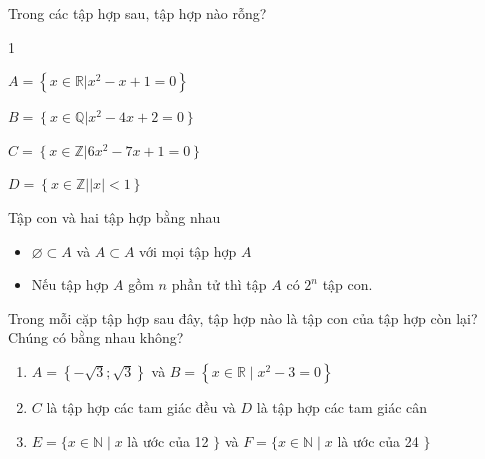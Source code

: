 \begin{vd}
	Trong các tập hợp sau, tập hợp nào rỗng?
	\begin{enumEX}{1}
		\item $A=\left\{\left. x\in \mathbb{R}\right|x^2-x+1=0\right\}$
		\item $B=\left\{\left. x\in \mathbb{Q}\right|\right.x^2-4x+2\left. =0\right\}$
		\item $C=\left\{\left. x\in \mathbb{Z}\right|\right.6x^2-7x+1\left. =0\right\}$
		\item $D=\left\{\left. x\in \mathbb{Z}\right|\right.\left| x\right|<\left. 1\right\}$
	\end{enumEX}
\end{vd}
\begin{dang}{Tập con và hai tập hợp bằng nhau}
	\begin{itemize}
		\item $\varnothing \subset A$  và $A \subset A$ với mọi tập hợp $A$
		\item Nếu tập hợp $A$ gồm $n$ phần tử thì tập $A$ có $2^n$ tập con.
	\end{itemize}
\end{dang}
\begin{vd}%
	Trong mỗi cặp tập hợp sau đây, tập hợp nào là tập con của tập hợp còn lại? Chúng có bằng nhau không?
	\begin{enumerate}
		\item $A=\left\{-\sqrt{3}; \sqrt{3}\right\}$ và $B=\left\{x \in \mathbb{R} \mid x^2-3=0\right\}$
		\item $C$ là tập hợp các tam giác đều và $D$ là tập hợp các tam giác cân
		\item $E=\{x \in \mathbb{N} \mid x$ là ước của 12 $\}$ và $F=\{x \in \mathbb{N} \mid x$ là ước của 24 $\}$
	\end{enumerate}
\end{vd}
